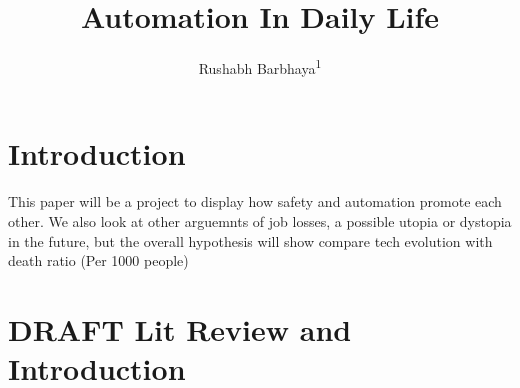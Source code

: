 \documentclass[
  english,
  man]{apa7}
\title{Automation In Daily Life}
\author{Rushabh Barbhaya\textsuperscript{1}}
\date{}
\affiliation{\vspace{0.5cm}\textsuperscript{1} Harrisburg University of Science and Technology}
\begin{document}
\maketitle

\hypertarget{introduction}{%
\section{Introduction}\label{introduction}}

This paper will be a project to display how safety and automation promote each other. We also look at other arguemnts of job losses, a possible utopia or dystopia in the future, but the overall hypothesis will show compare tech evolution with death ratio (Per 1000 people)

\hypertarget{draft-lit-review-and-introduction}{%
\section{DRAFT Lit Review and Introduction}\label{draft-lit-review-and-introduction}}
\end{document}
